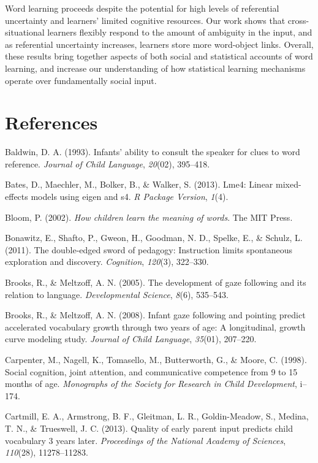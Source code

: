 \documentclass[a4paper,man,floatsintext]{apa6}
\begin{document}
Word learning proceeds despite the potential for high levels of
referential uncertainty and learners' limited cognitive resources. Our
work shows that cross-situational learners flexibly respond to the
amount of ambiguity in the input, and as referential uncertainty
increases, learners store more word-object links. Overall, these results
bring together aspects of both social and statistical accounts of word
learning, and increase our understanding of how statistical learning
mechanisms operate over fundamentally social input.

\newpage

\section*{References}\label{references}

Baldwin, D. A. (1993). Infants' ability to consult the speaker for clues
to word reference. \emph{Journal of Child Language}, \emph{20}(02),
395--418.

Bates, D., Maechler, M., Bolker, B., \& Walker, S. (2013). Lme4: Linear
mixed-effects models using eigen and s4. \emph{R Package Version},
\emph{1}(4).

Bloom, P. (2002). \emph{How children learn the meaning of words}. The
MIT Press.

Bonawitz, E., Shafto, P., Gweon, H., Goodman, N. D., Spelke, E., \&
Schulz, L. (2011). The double-edged sword of pedagogy: Instruction
limits spontaneous exploration and discovery. \emph{Cognition},
\emph{120}(3), 322--330.

Brooks, R., \& Meltzoff, A. N. (2005). The development of gaze following
and its relation to language. \emph{Developmental Science}, \emph{8}(6),
535--543.

Brooks, R., \& Meltzoff, A. N. (2008). Infant gaze following and
pointing predict accelerated vocabulary growth through two years of age:
A longitudinal, growth curve modeling study. \emph{Journal of Child
Language}, \emph{35}(01), 207--220.

Carpenter, M., Nagell, K., Tomasello, M., Butterworth, G., \& Moore, C.
(1998). Social cognition, joint attention, and communicative competence
from 9 to 15 months of age. \emph{Monographs of the Society for Research
in Child Development}, i--174.

Cartmill, E. A., Armstrong, B. F., Gleitman, L. R., Goldin-Meadow, S.,
Medina, T. N., \& Trueswell, J. C. (2013). Quality of early parent input
predicts child vocabulary 3 years later. \emph{Proceedings of the
National Academy of Sciences}, \emph{110}(28), 11278--11283.
\end{document}

